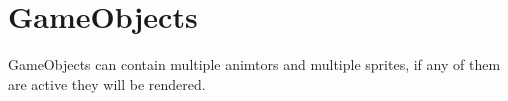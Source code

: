 \section{GameObjects}
GameObjects can contain multiple animtors and multiple sprites, if any of them are active they will be rendered.